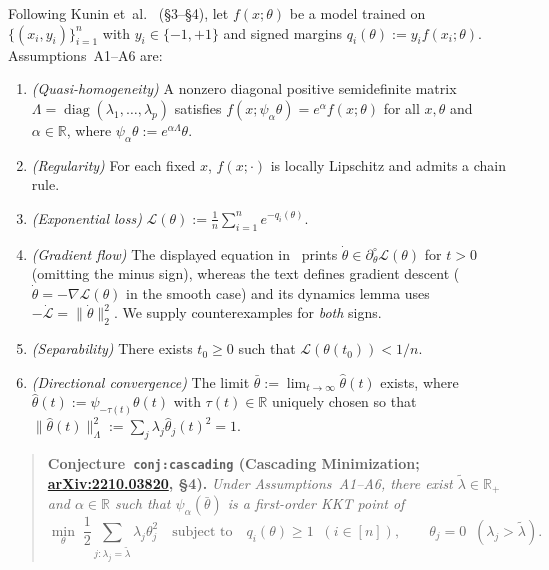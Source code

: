 \documentclass[11pt]{article}
\theoremstyle{plain}
\theoremstyle{definition}
\theoremstyle{remark}
\DeclareMathOperator{\diag}{diag}
\begin{document}
Following Kunin et~al.~\cite{Kunin2023} (\S 3--\S 4), let $f(x; \theta)$ be a model trained on $\{(x_i, y_i)\}_{i=1}^n$ with $y_i \in \{-1, +1\}$ and signed margins $q_i(\theta) := y_i f(x_i; \theta)$. Assumptions~A1--A6 are:
\begin{enumerate}[label=\textbf{A\arabic*.},leftmargin=*]
\item \emph{(Quasi-homogeneity)} A nonzero diagonal positive semidefinite matrix $\Lambda = \diag(\lambda_1, \dots, \lambda_p)$ satisfies $f(x; \psi_\alpha \theta) = e^\alpha f(x; \theta)$ for all $x, \theta$ and $\alpha \in \mathbb{R}$, where $\psi_\alpha \theta := e^{\alpha \Lambda}\theta$.
\item \emph{(Regularity)} For each fixed $x$, $f(x; \cdot)$ is locally Lipschitz and admits a chain rule.
\item \emph{(Exponential loss)} $\mathcal{L}(\theta) := \frac{1}{n}\sum_{i=1}^n e^{-q_i(\theta)}$.
\item \emph{(Gradient flow)} The displayed equation in~\cite{Kunin2023} prints $\dot{\theta} \in \partial^\circ_\theta \mathcal{L}(\theta)$ for $t > 0$ (omitting the minus sign), whereas the text defines gradient descent ($\dot{\theta} = -\nabla \mathcal{L}(\theta)$ in the smooth case) and its dynamics lemma uses $-\dot{\mathcal{L}} = \|\dot{\theta}\|_2^2$. We supply counterexamples for \emph{both} signs.
\item \emph{(Separability)} There exists $t_0 \ge 0$ such that $\mathcal{L}(\theta(t_0)) < 1/n$.
\item \emph{(Directional convergence)} The limit $\bar{\theta} := \lim_{t \to \infty} \hat{\theta}(t)$ exists, where $\hat{\theta}(t) := \psi_{-\tau(t)}\theta(t)$ with $\tau(t) \in \mathbb{R}$ uniquely chosen so that $\|\hat{\theta}(t)\|_\Lambda^2 := \sum_j \lambda_j \hat{\theta}_j(t)^2 = 1$.
\end{enumerate}

\begin{quote}
\textbf{Conjecture~\texttt{conj:cascading} (Cascading Minimization; \href{https://arxiv.org/abs/2210.03820}{arXiv:2210.03820}, \S 4).}
\emph{Under Assumptions~A1--A6, there exist $\tilde{\lambda} \in \mathbb{R}_+$ and $\alpha \in \mathbb{R}$ such that $\psi_\alpha(\bar{\theta})$ is a first-order KKT point of}
\begin{equation}\label{eq:cascade-opt}
\min_{\theta}\; \frac{1}{2}\sum_{j : \lambda_j = \tilde{\lambda}} \lambda_j \theta_j^2
\quad\text{subject to}\quad
q_i(\theta) \ge 1\;\; (i \in [n]), \qquad
\theta_j = 0\;\; (\lambda_j > \tilde{\lambda}).
\end{equation}
\end{quote}
\end{document}
